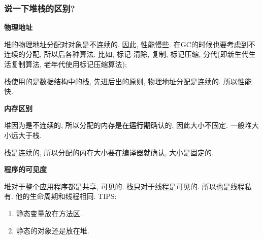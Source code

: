 \subsubsection{说一下堆栈的区别?}
\textbf{物理地址}
\par
堆的物理地址分配对对象是不连续的. 因此, 性能慢些. 在GC的时候也要考虑到不连续的分配, 所以后各种算法. 比如, 标记-清除, 复制, 标记压缩, 分代(即新生代生活复制算法, 老年代使用标记压缩算法);
\par
栈使用的是数据结构中的栈, 先进后出的原则, 物理地址分配是连续的. 所以性能快.
\par
\textbf{内存区别}
\par
堆因为是不连续的, 所以分配的内存是在\textbf{运行期}确认的, 因此大小不固定. 一般堆大小远大于栈.
\par
栈是连续的, 所以分配的内存大小要在编译器就确认, 大小是固定的.
\par
\textbf{程序的可见度}
\par
堆对于整个应用程序都是共享, 可见的.
栈只对于线程是可见的. 所以也是线程私有. 他的生命周期和线程相同.
TIPS:
\begin{enumerate}
	\item 静态变量放在方法区.
	\item 静态的对象还是放在堆.
\end{enumerate}


